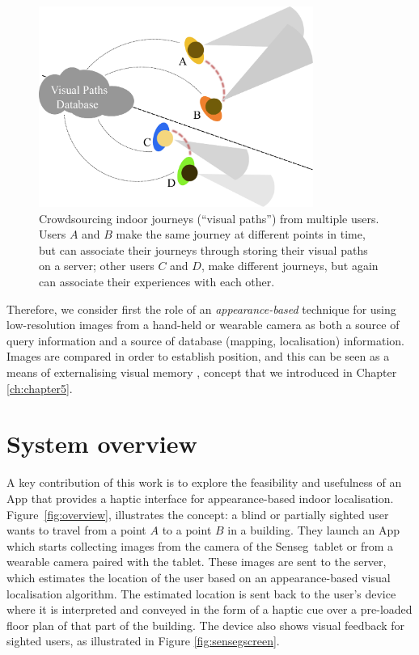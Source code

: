 \begin{figure}[h]
\centering
\includegraphics[width=0.8\textwidth]{./gfx/Chapter06/AssociatingViews.pdf}
\caption{Crowdsourcing indoor journeys (``visual paths'') from multiple users.  Users $A$ and $B$ make the same journey at different points in time, but can associate their journeys through storing their visual paths on a server; other users $C$ and $D$, make different journeys, but again can associate their experiences with each other.}
\label{fig:associatingViews}
\end{figure}

Therefore, we consider first the role of an {\em appearance-based} technique for using low-resolution images from a hand-held or wearable camera as both a source of query information and a source of database (mapping, localisation) information. Images are compared in order to establish position, and this can be seen as a means of externalising visual memory \citep{tversky2000some}, concept that we introduced in Chapter \ref{ch:chapter5}. 

\section{System overview}
\label{sec:overview}

A key contribution of this work is to explore the feasibility and usefulness of an App that provides a haptic interface for appearance-based indoor localisation. Figure~\ref{fig:overview}, illustrates the concept: a blind or partially sighted user wants to travel from a point $A$ to a point $B$ in a building. They launch an App which starts collecting images from the camera of the Senseg\texttrademark\ tablet or from a wearable camera paired with the tablet. These images are sent to the server, which estimates the location of the user based on an appearance-based visual localisation algorithm. The estimated location is sent back to the user's device where it is interpreted and conveyed in the form of a haptic cue over a pre-loaded floor plan of that part of the building. The device also shows visual feedback for sighted users, as illustrated in Figure \ref{fig:sensegscreen}.


